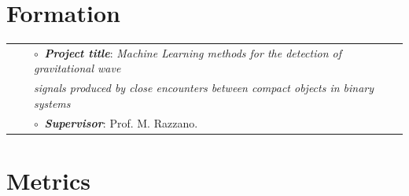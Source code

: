 
\section{Formation}

\vspace{-0.1cm}
\begin{tabular}{rcl}
&\hspace{0.4cm} &$\circ\;\;${\textbf{\textit{Project title}}}: \textit{Machine Learning methods for the detection of gravitational wave}\\&\hspace{0.4cm} &
\textit{\phantom{Project title title}signals produced by close encounters between compact objects in binary systems}\\
&\hspace{0.4cm} &$\circ\;\;${\textbf{\textit{Supervisor}}}:  Prof. M. Razzano.\\
\end{tabular}
\vspace{0.2cm}


\section{Metrics}



%

\vspace{0.2cm}



%



\vspace{0.2cm}






